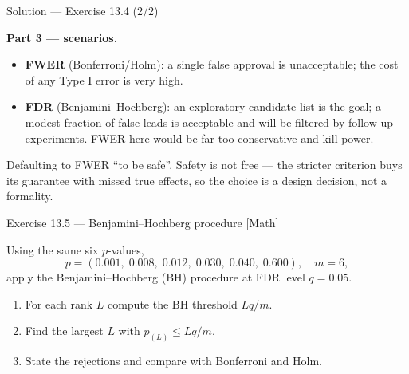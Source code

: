 \documentclass[aspectratio=169,11pt]{beamer}
\begin{document}
\begin{frame}{Solution --- Exercise 13.4 (2/2)}
\begin{solutionbox}
  \textbf{Part 3 --- scenarios.}
  \begin{itemize}
    \item[(i)] \textbf{FWER} (Bonferroni/Holm): a single false
          approval is unacceptable; the cost of any Type I error is
          very high.
    \item[(ii)] \textbf{FDR} (Benjamini--Hochberg): an exploratory
          candidate list is the goal; a modest fraction of false leads
          is acceptable and will be filtered by follow-up experiments.
          FWER here would be far too conservative and kill power.
  \end{itemize}

\end{solutionbox}
\begin{mistake}
  Defaulting to FWER ``to be safe''. Safety is not free --- the stricter
  criterion buys its guarantee with missed true effects, so the choice is a
  design decision, not a formality.
\end{mistake}
\end{frame}

\begin{frame}{Exercise 13.5 --- Benjamini--Hochberg procedure [Math]}
\begin{exercise}
  Using the same six $p$-values,
  \[
    p = (0.001,\; 0.008,\; 0.012,\; 0.030,\; 0.040,\; 0.600),
    \quad m = 6 ,
  \]
  apply the Benjamini--Hochberg (BH) procedure at FDR level
  $q = 0.05$.
  \begin{enumerate}
    \item For each rank $L$ compute the BH threshold $L q / m$.
    \item Find the largest $L$ with $p_{(L)} \le L q / m$.
    \item State the rejections and compare with Bonferroni and Holm.
  \end{enumerate}
\end{exercise}
\end{frame}
\end{document}
